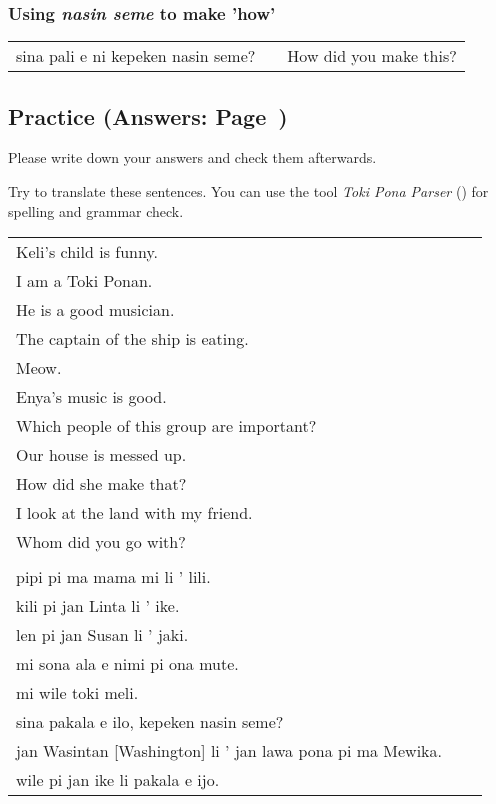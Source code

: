\subsubsection*{Using \textit{nasin seme} to make 'how'}
%
\begin{supertabular}{p{5,5cm}|ll}
sina pali e ni kepeken nasin seme? && How did you make this? \\
\end{supertabular}  
%
%
\newpage
\subsection*{Practice (Answers: Page~\pageref{'pi'})}
%
Please write down your answers and check them afterwards. 

Try to translate these sentences. 
You can use the tool \textit{Toki Pona Parser} (\cite{www:rowa:02}) for spelling and grammar check. 

\begin{supertabular}{p{5,5cm}|ll}
Keli's child is funny.    \\ %
I am a Toki Ponan.   \\  %
He is a good musician.   \\  %
The captain of the ship is eating.    \\ %
Meow.    \\ %
Enya's music is good.    \\ %
Which people of this group are important?    \\ %
Our house is messed up.    \\ %
How did she make that?    \\ %
I look at the land with my friend. && \\ %
Whom did you go with? &&  \\  %
 && \\ %
pipi pi ma mama mi li ' lili.  \\ %
kili pi jan Linta li ' ike.    \\ %
len pi jan Susan li ' jaki.    \\ %
mi sona ala e nimi pi ona mute.    \\ %
mi wile toki meli.    \\ %
sina pakala e ilo, kepeken nasin seme?    \\ %
jan Wasintan [Washington] li ' jan lawa pona pi ma Mewika.  \\   %
wile pi jan ike li pakala e ijo.    \\ %
\end{supertabular}  
